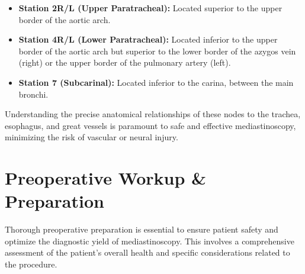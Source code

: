 \begin{itemize}
  \item \textbf{Station 2R/L (Upper Paratracheal):} Located superior to the upper border of the aortic arch.
  \item \textbf{Station 4R/L (Lower Paratracheal):} Located inferior to the upper border of the aortic arch but superior to the lower border of the azygos vein (right) or the upper border of the pulmonary artery (left).
  \item \textbf{Station 7 (Subcarinal):} Located inferior to the carina, between the main bronchi.
\end{itemize}
Understanding the precise anatomical relationships of these nodes to the trachea, esophagus, and great vessels is paramount to safe and effective mediastinoscopy, minimizing the risk of vascular or neural injury.

\section*{Preoperative Workup \& Preparation}
Thorough preoperative preparation is essential to ensure patient safety and optimize the diagnostic yield of mediastinoscopy. This involves a comprehensive assessment of the patient's overall health and specific considerations related to the procedure.

